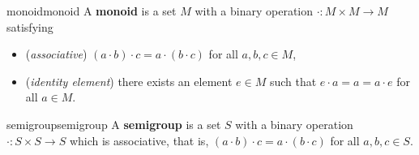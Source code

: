 \begin{topic}{monoid}{monoid}
    A \textbf{monoid} is a set $M$ with a binary operation $\cdot : M \times M \to M$ satisfying
    \begin{itemize}
        \item (\textit{associative}) $(a \cdot b) \cdot c = a \cdot (b \cdot c)$ for all $a, b, c \in M$,
        \item (\textit{identity element}) there exists an element $e \in M$ such that $e \cdot a = a = a \cdot e$ for all $a \in M$.
    \end{itemize}
\end{topic}

\begin{topic}{semigroup}{semigroup}
    A \textbf{semigroup} is a set $S$ with a binary operation $\cdot : S \times S \to S$ which is associative, that is, $(a \cdot b) \cdot c = a \cdot (b \cdot c)$ for all $a, b, c \in S$.
\end{topic}



